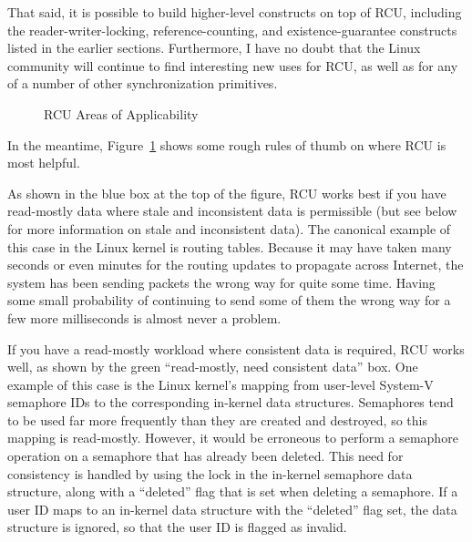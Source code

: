 That said, it is possible to build higher-level constructs
on top of RCU, including the reader-writer-locking, reference-counting,
and existence-guarantee constructs listed in the earlier sections.
Furthermore, I have no doubt that the Linux community will continue to
find interesting new uses for RCU,
as well as for any of a number of other synchronization primitives.

\begin{figure}[tbh]
\centering
{}
\caption{RCU Areas of Applicability}
\label{fig:defer:RCU Areas of Applicability}
\end{figure}

In the meantime,
Figure~\ref{fig:defer:RCU Areas of Applicability}
shows some rough rules of thumb on where RCU is most helpful.

As shown in the blue box at the top of the figure, RCU works best if
you have read-mostly data where stale and inconsistent
data is permissible (but see below for more information on stale and
inconsistent data).
The canonical example of this case in the Linux kernel is routing tables.
Because it may have taken many seconds or even minutes for the
routing updates to propagate across Internet, the system
has been sending packets the wrong way for quite some time.
Having some small probability of continuing to send some of them the wrong
way for a few more milliseconds is almost never a problem.

If you have a read-mostly workload where consistent data is required,
RCU works well, as shown by the green ``read-mostly, need consistent data''
box.
One example of this case is the Linux kernel's mapping from user-level
System-V semaphore IDs to the corresponding in-kernel data structures.
Semaphores tend to be used far more frequently than they are created
and destroyed, so this mapping is read-mostly.
However, it would be erroneous to perform a semaphore operation on
a semaphore that has already been deleted.
This need for consistency is handled by using the lock in the
in-kernel semaphore data structure, along with a ``deleted''
flag that is set when deleting a semaphore.
If a user ID maps to an in-kernel data structure with the
``deleted'' flag set, the data structure is ignored, so that
the user ID is flagged as invalid.

